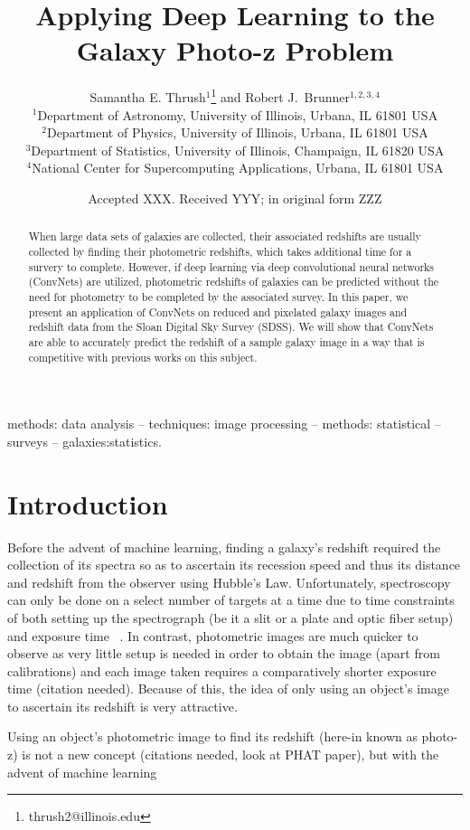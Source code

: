 \documentclass[fleqn,usenatbib]{mnras}
\title[Dreaming of Photo-z's]{Applying Deep Learning to the Galaxy Photo-z Problem}
\author[S. E. Thrush and R. J. Brunner]{
  Samantha E. Thrush$^1$\thanks{thrush2@illinois.edu} and Robert J.~Brunner$^{1,2,3,4}$ \\
$^1$Department of Astronomy, University of Illinois, Urbana, IL 61801 USA\\
$^2$Department of Physics, University of Illinois, Urbana, IL 61801 USA\\
$^3$Department of Statistics, University of Illinois, Champaign, IL 61820 USA\\
$^4$National Center for Supercomputing Applications, Urbana, IL 61801 USA
}
\date{Accepted XXX. Received YYY; in original form ZZZ}
\begin{document}
\label{firstpage}
\pagerange{\pageref{firstpage}--\pageref{lastpage}}
\maketitle

\begin{abstract}
When large data sets of galaxies are collected, their associated redshifts are usually collected by finding their photometric redshifts, which takes additional time for a survery to complete.  However, if deep learning via deep convolutional neural networks (ConvNets) are utilized, photometric redshifts of galaxies can be predicted without the need for photometry to be completed by the associated survey. In this paper, we present an application of ConvNets on reduced and pixelated galaxy images and redshift data from the Sloan Digital Sky Survey (SDSS).  We will show that ConvNets are able to accurately predict the redshift of a sample galaxy image in a way that is competitive with previous works on this subject.
\end{abstract}

\begin{keywords}
methods: data analysis -- techniques: image processing -- methods: statistical
-- surveys -- galaxies:statistics.
\end{keywords}

\section{Introduction}
  \label{sec:introduction}
Before the advent of machine learning, finding a galaxy's redshift required the collection of its spectra so as to ascertain its recession speed and thus its distance and redshift from the observer using Hubble's Law. Unfortunately, spectroscopy can only be done on a select number of targets at a time due to time constraints of both setting up the spectrograph (be it a slit or a plate and optic fiber setup) and exposure time ~\citep{york_sloan_2000}.  In contrast, photometric images are much quicker to observe as very little setup is needed in order to obtain the image (apart from calibrations) and each image taken requires a comparatively shorter exposure time (citation needed).  Because of this, the idea of only using an object's image to ascertain its redshift is very attractive.  

Using an object's photometric image to find its redshift (here-in known as photo-z) is not a new concept (citations needed, look at PHAT paper), but with the advent of machine learning 
\end{document}
